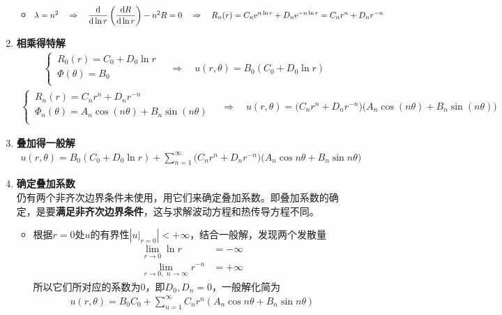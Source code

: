\begin{enumerate}[\textbf{步骤}1 ]
\begin{itemize}
		\item $\lambda = n^2 \quad \Rightarrow \quad \dfrac{{\rm{d}} }{{\rm{d}} \ln r} \left(\dfrac{{\rm{d}} R}{{\rm{d}} \ln r}\right) - n^2 R = 0 \quad \Rightarrow \quad R_n(r) = C_n {\rm{e}}^{n \ln r} + D_n {\rm{e}}^{-n \ln r} = C_n r^n + D_n r^{-n}$
	\end{itemize}

	\item \textbf{相乘得特解}
	\begin{align*}
		\begin{cases}
			\, R_0(r) = C_0 + D_0 \ln r\\
			\, \Phi(\theta) = B_0\\
		\end{cases}
	\quad \Rightarrow \quad u(r, \theta) = B_0(C_0 + D_0 \ln r)
	\end{align*}
	\vspace*{-1.5em}
	\begin{align*}
		\begin{cases}
			\, R_n(r) = C_n r^n + D_n r^{-n}\\
			\, \Phi_n(\theta) = A_n \cos(n\theta) + B_n \sin(n \theta)\\
		\end{cases}
		\quad \Rightarrow \quad u(r, \theta) = \big(C_n r^n + D_n r^{-n}\big)\big(A_n \cos(n\theta) + B_n \sin(n \theta)\big)
	\end{align*}
	
	\item \textbf{叠加得一般解}
	\begin{align}
		u(r, \theta) =  B_0(C_0 + D_0 \ln r) + \sum_{n = 1}^\infty \big(C_n r^n + D_n r^{-n}\big)\big(A_n \cos n\theta + B_n \sin n \theta \big)
	\end{align}

	\item \textbf{确定叠加系数}\\
	仍有两个非齐次边界条件未使用，用它们来确定叠加系数。即叠加系数的确定，是要\textbf{满足非齐次边界条件}，这与求解波动方程和热传导方程不同。
	\begin{itemize}
		\item 根据$r = 0$处$u$的有界性$\left|u|_{r = 0}\right| < + \infty$，结合一般解，发现两个发散量
		\begin{align*}
			\lim\limits_{r \to 0} \ln r &= - \infty\\
			\lim\limits_{r \to 0,\,\, n\to \infty} r^{-n} &= + \infty
		\end{align*}
		所以它们所对应的系数为0，即$D_0, D_n = 0$，一般解化简为
		\begin{align*}
			u(r, \theta) =  B_0C_0 + \sum_{n = 1}^\infty C_n r^n (A_n \cos n\theta + B_n \sin n \theta)
		\end{align*}
		

\end{itemize}
\end{enumerate}
